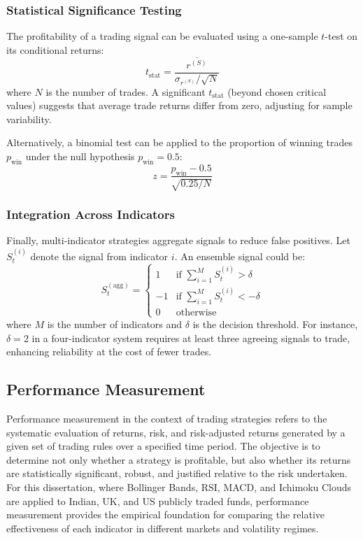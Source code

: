 \subsubsection{Statistical Significance Testing}

The profitability of a trading signal can be evaluated using a one-sample $t$-test on its conditional returns:
\[
t_{\text{stat}} = \frac{\overline{r^{(S)}}}{\sigma_{r^{(S)}} / \sqrt{N}}
\]
where $N$ is the number of trades. A significant $t_{\text{stat}}$ (beyond chosen critical values) suggests that average trade returns differ from zero, adjusting for sample variability.

Alternatively, a binomial test can be applied to the proportion of winning trades $p_{\text{win}}$ under the null hypothesis $p_{\text{win}} = 0.5$:
\[
z = \frac{p_{\text{win}} - 0.5}{\sqrt{0.25 / N}}
\]

\subsubsection{Integration Across Indicators}

Finally, multi-indicator strategies aggregate signals to reduce false positives. Let $S_t^{(i)}$ denote the signal from indicator $i$. An ensemble signal could be:
\[
S_t^{(\text{agg})} = 
\begin{cases}
1 & \text{if } \sum_{i=1}^M S_t^{(i)} > \delta \\
-1 & \text{if } \sum_{i=1}^M S_t^{(i)} < -\delta \\
0 & \text{otherwise}
\end{cases}
\]
where $M$ is the number of indicators and $\delta$ is the decision threshold. For instance, $\delta = 2$ in a four-indicator system requires at least three agreeing signals to trade, enhancing reliability at the cost of fewer trades.


\subsection{Performance Measurement}

Performance measurement in the context of trading strategies refers to the systematic evaluation of returns, risk, and risk-adjusted returns generated by a given set of trading rules over a specified time period. The objective is to determine not only whether a strategy is profitable, but also whether its returns are statistically significant, robust, and justified relative to the risk undertaken. For this dissertation, where Bollinger Bands, RSI, MACD, and Ichimoku Clouds are applied to Indian, UK, and US publicly traded funds, performance measurement provides the empirical foundation for comparing the relative effectiveness of each indicator in different markets and volatility regimes.

